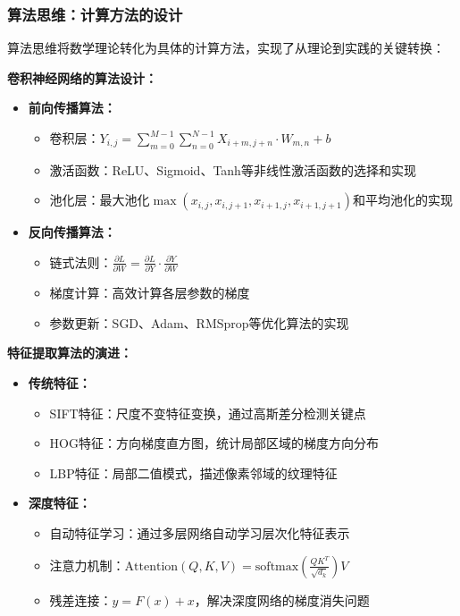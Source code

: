 \subsubsection{算法思维：计算方法的设计}

算法思维将数学理论转化为具体的计算方法，实现了从理论到实践的关键转换：

\textbf{卷积神经网络的算法设计：}
\begin{itemize}
\item \textbf{前向传播算法：}
\begin{itemize}
\item 卷积层：$Y_{i,j} = \sum_{m=0}^{M-1} \sum_{n=0}^{N-1} X_{i+m,j+n} \cdot W_{m,n} + b$
\item 激活函数：ReLU、Sigmoid、Tanh等非线性激活函数的选择和实现
\item 池化层：最大池化$\max(x_{i,j}, x_{i,j+1}, x_{i+1,j}, x_{i+1,j+1})$和平均池化的实现
\end{itemize}
\item \textbf{反向传播算法：}
\begin{itemize}
\item 链式法则：$\frac{\partial L}{\partial W} = \frac{\partial L}{\partial Y} \cdot \frac{\partial Y}{\partial W}$
\item 梯度计算：高效计算各层参数的梯度
\item 参数更新：SGD、Adam、RMSprop等优化算法的实现
\end{itemize}
\end{itemize}

\textbf{特征提取算法的演进：}
\begin{itemize}
\item \textbf{传统特征：}
\begin{itemize}
\item SIFT特征：尺度不变特征变换，通过高斯差分检测关键点
\item HOG特征：方向梯度直方图，统计局部区域的梯度方向分布
\item LBP特征：局部二值模式，描述像素邻域的纹理特征
\end{itemize}
\item \textbf{深度特征：}
\begin{itemize}
\item 自动特征学习：通过多层网络自动学习层次化特征表示
\item 注意力机制：$\text{Attention}(Q,K,V) = \text{softmax}(\frac{QK^T}{\sqrt{d_k}})V$
\item 残差连接：$y = F(x) + x$，解决深度网络的梯度消失问题
\end{itemize}
\end{itemize}

